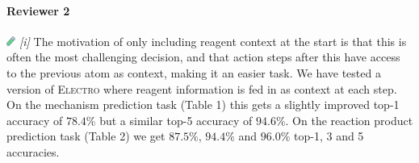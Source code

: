 \documentclass{article}
\newcommand{\ourModel}{\textsc{Electro}\xspace}
\begin{document}
% 



\vspace{-5pt}
\paragraph{Reviewer 2}
\includegraphics[width=0.3cm]{testtube.png} \emph{[i]}
The motivation of only including reagent context at the start is that this is often the most challenging decision, and that action steps after this have access to the previous atom as context, making it an easier task.
We have tested a version of \ourModel where reagent information is fed in as context at each step. 
On the mechanism prediction task (Table 1) this gets a slightly improved top-1 accuracy of $78.4\%$ but a similar top-5 accuracy of $94.6\%$.
 On the reaction product prediction task (Table 2) we get $87.5\%$, $94.4\%$ and $96.0\%$ top-1, 3 and 5 accuracies.
\end{document}
